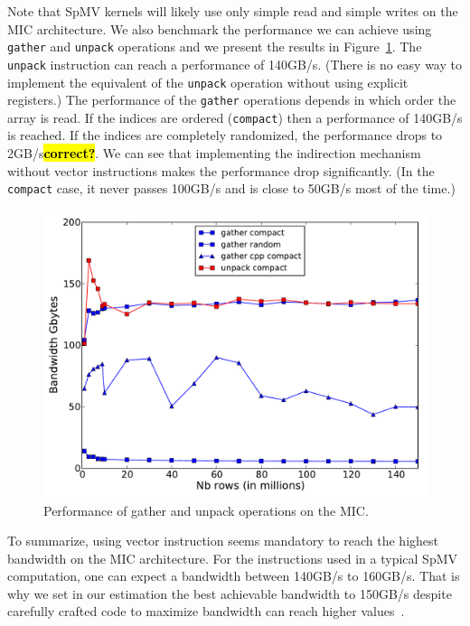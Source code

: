 \documentclass[10pt,conference,compsocconf]{IEEEtran}
\newcommand{\todo}[1]{{\color{red}\textbf{\hl{#1}}\xspace}}
\begin{document}
Note that SpMV kernels will likely use only simple read and simple
writes on the MIC architecture. We also benchmark the performance we
can achieve using {\tt gather} and {\tt unpack} operations and we
present the results in Figure~\ref{fig:band_gather}. The {\tt unpack}
instruction can reach a performance of 140GB/s. (There is no easy way
to implement the equivalent of the {\tt unpack} operation without
using explicit registers.) The performance of the {\tt gather}
operations depends in which order the array is read. If the indices
are ordered ({\tt compact}) then a performance of 140GB/s is
reached. If the indices are completely randomized, the performance
drops to 2GB/s\todo{correct?}. We can see that implementing the
indirection mechanism without vector instructions makes the
performance drop significantly. (In the {\tt compact} case, it never
passes 100GB/s and is close to 50GB/s most of the time.)

\begin{figure}
  \centering
  \includegraphics[width=\linewidth]{figures/bandwidth_gather_unpack.pdf}
  \caption{Performance of gather and unpack operations on the MIC.}
  \label{fig:band_gather} 
\end{figure}
%

To summarize, using vector instruction seems mandatory to reach the
highest bandwidth on the MIC architecture. For the instructions used
in a typical SpMV computation, one can expect a bandwidth between
140GB/s to 160GB/s. That is why we set in our estimation the best
achievable bandwidth to 150GB/s despite carefully crafted code to
maximize bandwidth can reach higher
values~\cite{Saule13-ARXIV}. 
\end{document}
